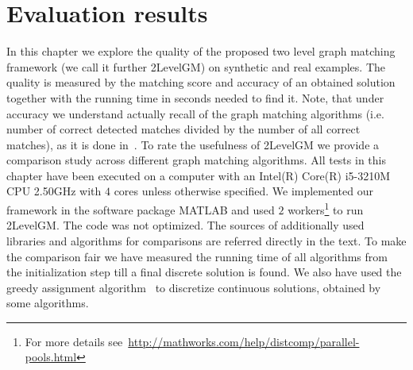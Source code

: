 \chapter{Evaluation results} \label{chapter:results}

In this chapter we explore the quality of the proposed two level graph matching framework (we call it further 2LevelGM) on synthetic and real examples. The quality is measured by the matching score and accuracy of an obtained solution together with the running time in seconds needed to find it. Note, that under accuracy we understand actually recall of the graph matching algorithms (i.e. number of correct detected matches divided by the number of all correct matches), as it is done in~\cite{Cho2010_RRWM,Cho2012_ProgressiveGM,Cho2014_Haystack,Duchenne2011,Rangarajan1996_GAGM,Leordeanu2005_SM,Leordeanu2009_IPFP}.
To rate the usefulness of 2LevelGM we provide a comparison study across different graph matching algorithms. All tests in this chapter have been executed on a computer with an Intel(R) Core(R) i5-3210M CPU 2.50GHz with $4$ cores unless otherwise specified. We implemented our framework in the software package MATLAB and used $2$ workers\footnote{For more details see~\url{http://mathworks.com/help/distcomp/parallel-pools.html}} to run 2LevelGM. The code was not optimized. The sources of additionally used libraries and algorithms for comparisons are referred directly in the text. %
To make the comparison fair we have measured the running time of all algorithms from the initialization step till a final discrete solution is found. We also have used the greedy assignment algorithm~\cite{Leordeanu2005_SM} to discretize continuous solutions, obtained by some algorithms.

